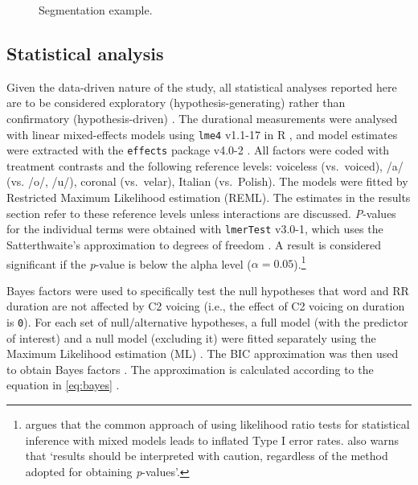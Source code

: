 \documentclass[preprint]{JASAnew}
\begin{document}
\begin{figure}
  \caption{Segmentation example.}
  \label{f:segmentation}
\end{figure}

\hypertarget{statistical-analysis}{%
\subsection{Statistical analysis}\label{statistical-analysis}}

Given the data-driven nature of the study, all statistical analyses
reported here are to be considered exploratory (hypothesis-generating)
rather than confirmatory (hypothesis-driven)
\citep{kerr1998, gelman2013, roettger2018}. The durational measurements
were analysed with linear mixed-effects models using \texttt{lme4}
v1.1-17 in R \citep{bates2015}, and model estimates were extracted with
the \texttt{effects} package v4.0-2 \citep{fox2003}. All factors were
coded with treatment contrasts and the following reference levels:
voiceless (vs.~voiced), /a/ (vs. /o/, /u/), coronal (vs.~velar), Italian
(vs.~Polish). The models were fitted by Restricted Maximum Likelihood
estimation (REML). The estimates in the results section refer to these
reference levels unless interactions are discussed. \emph{P}-values for
the individual terms were obtained with \texttt{lmerTest} v3.0-1, which
uses the Satterthwaite's approximation to degrees of freedom
\citep{kuznetsova2017, luke2017}. A result is considered significant if
the \emph{p}-value is below the alpha level
(\(\alpha = 0.05\)).\footnote{\citet{luke2017} argues that the common approach of using likelihood ratio tests for statistical inference with mixed models leads to inflated Type I error rates. \citet[1501]{luke2017} also warns that `results should be interpreted with caution, regardless of the method adopted for obtaining \textit{p}-values'.}

Bayes factors were used to specifically test the null hypotheses that
word and RR duration are not affected by C2 voicing (i.e., the effect of
C2 voicing on duration is \texttt{0}). For each set of null/alternative
hypotheses, a full model (with the predictor of interest) and a null
model (excluding it) were fitted separately using the Maximum Likelihood
estimation (ML) \citep[p.~34]{bates2015}. The BIC approximation was then
used to obtain Bayes factors
\citep{raftery1995, raftery1999, wagenmakers2007, jarosz2014}. The
approximation is calculated according to the equation in \ref{eq:bayes}
\citep[p.~796]{wagenmakers2007}.
\end{document}
